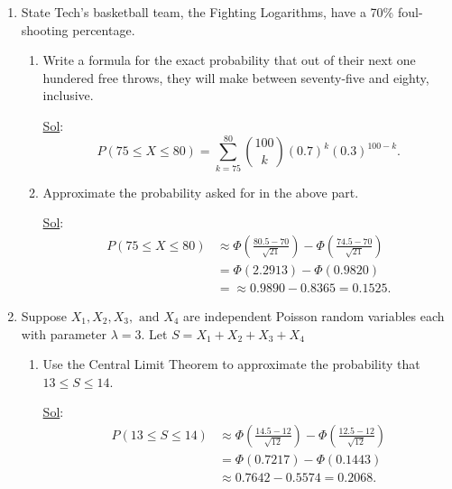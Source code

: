 \begin{enumerate}
	\item[10.] State Tech's basketball team, the Fighting Logarithms, have a 70\% foul-shooting percentage.
	      \begin{enumerate}
		      \item Write a formula for the exact probability that out of their next one hundered free throws, they will make between seventy-five and eighty, inclusive.

		            \underline{Sol}: \\

		            \[
			            P(75 \le X \le 80) = \sum_{k=75}^{80} \binom{100}{k} (0.7)^k (0.3)^{100-k}.
		            \]


		      \item Approximate the probability asked for in the above part.

		            \underline{Sol}: \\

		            \[
			            \begin{aligned}
				            P(75 \le X \le 80) & \approx \Phi\left(\frac{80.5-70}{\sqrt{21}}\right) - \Phi\left(\frac{74.5-70}{\sqrt{21}}\right) \\
				                               & = \Phi(2.2913) - \Phi(0.9820)                                                                   \\
				                               & = \approx 0.9890 - 0.8365 = \boxed{0.1525}.
			            \end{aligned}
		            \]
	      \end{enumerate}

	\item[18.] Suppose \(X_1, X_2, X_3, \textrm{ and } X_4\) are independent Poisson random variables each with parameter \(\lambda = 3\). Let \(S = X_1 + X_2 + X_3 + X_4\)
	      \begin{enumerate}
		      \item Use the Central Limit Theorem to approximate the probability that \(13 \leq S \leq 14\).

		            \underline{Sol}: \\

		            \[
			            \begin{aligned}
				            P(13 \le S \le 14) & \approx \Phi\left(\frac{14.5-12}{\sqrt{12}}\right) - \Phi\left(\frac{12.5-12}{\sqrt{12}}\right) \\
				                               & = \Phi(0.7217) - \Phi(0.1443)                                                                   \\
				                               & \approx 0.7642 - 0.5574 = \boxed{0.2068}.
			            \end{aligned}
		            \]


\end{enumerate}
\end{enumerate}
